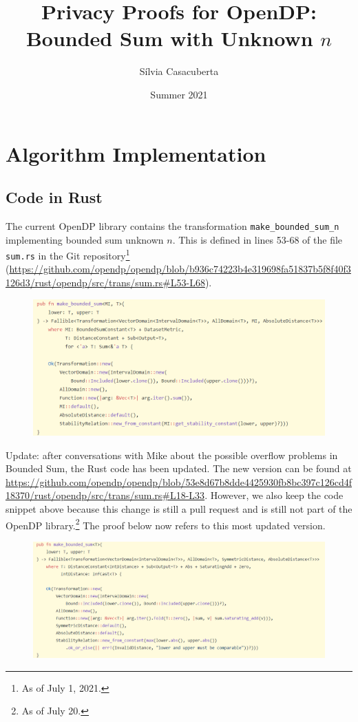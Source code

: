 \documentclass[11pt,a4paper]{article}
\title{Privacy Proofs for OpenDP: Bounded Sum with Unknown $n$}
\author{S\'ilvia Casacuberta}
\date{Summer 2021}
\theoremstyle{definition}
\begin{document}
\maketitle

\tableofcontents

\section{Algorithm Implementation}
\subsection{Code in Rust}
The current OpenDP library contains the transformation \texttt{make\_bounded\_sum\_n} implementing bounded sum unknown $n$. This is defined in lines 53-68 of the file \texttt{sum.rs} in the Git repository\footnote{As of July 1, 2021.} (\url{https://github.com/opendp/opendp/blob/b936c74223b4e319698fa51837b5f8f40f3126d3/rust/opendp/src/trans/sum.rs#L53-L68}).

\begin{figure}[ht]
    \includegraphics[width=14cm]{sum2.png}
    \centering
    \label{fig:code}
\end{figure}

\newpage

Update: after conversations with Mike about the possible overflow problems in Bounded Sum, the Rust code has been updated. The new version can be found at \url{https://github.com/opendp/opendp/blob/53e8d67b8dde4425930fb8bc397c126cd4f18370/rust/opendp/src/trans/sum.rs#L18-L33}. However, we also keep the code snippet above because this change is still a pull request and is still not part of the OpenDP library.\footnote{As of July 20.} The proof below now refers to this most updated version.

\begin{figure}[ht]
    \includegraphics[width=15cm]{bounded_sum_3.png}
    \centering
    \label{fig:code}
\end{figure}
\end{document}
